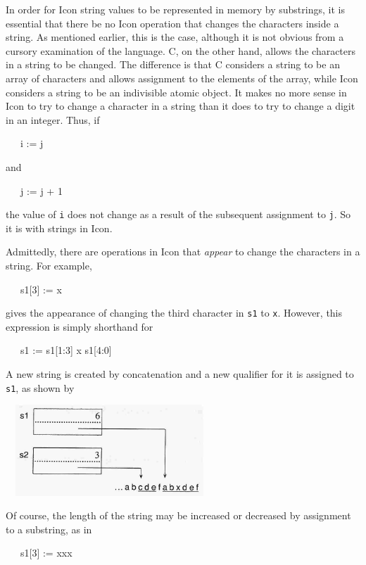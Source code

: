 In order for Icon string values to be represented in memory by
substrings, it is essential that there be no Icon operation that
changes the characters inside a string. As mentioned earlier, this is
the case, although it is not obvious from a cursory examination of the
language. C, on the other hand, allows the characters in a string to
be changed. The difference is that C considers a string to be an array
of characters and allows assignment to the elements of the array,
while Icon considers a string to be an indivisible atomic object. It
makes no more sense in Icon to try to change a character in a string
than it does to try to change a digit in an integer. Thus, if

{\ttfamily\mdseries
\ \ \ i := j}

and

{\ttfamily\mdseries
\ \ \ j := j + 1}

\noindent the value of \texttt{i} does not change as a result of the
subsequent assignment to \texttt{j}. So it is with strings in Icon.

Admittedly, there are operations in Icon that \textit{appear }to
change the characters in a string. For example,

{\ttfamily\mdseries
\ \ \ s1[3] := {\textquotedbl}x{\textquotedbl}}

\noindent gives the appearance of changing the third character in
\texttt{s1} to \texttt{{\textquotedbl}x{\textquotedbl}}.  However,
this expression is simply shorthand for

{\ttfamily\mdseries
\ \ \ s1 := s1[1:3] {\textbar}{\textbar} {\textquotedbl}x{\textquotedbl} {\textbar}{\textbar} s1[4:0]}

A new string is created by concatenation and a new qualifier for it is
assigned to \texttt{s1}, as shown by

\ \  \includegraphics[width=2.778in,height=1.3484in]{ib-img/ib-img023.jpg} 

Of course, the length of the string may be increased or decreased by
assignment to a substring, as in

\ \ \ s1[3] := {\textquotedbl}xxx{\textquotedbl}

